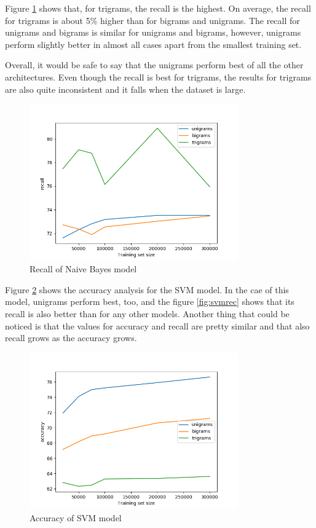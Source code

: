 Figure \ref{fig:nbrec} shows that, for trigrams, the recall is the highest. On average, the recall for trigrams is about 5\% higher than for bigrams and unigrams. The recall for unigrams and bigrams is similar for unigrams and bigrams, however, unigrams perform slightly better in almost all cases apart from the smallest training set.

Overall, it would be safe to say that the unigrams perform best of all the other architectures. Even though the recall is best for trigrams, the results for trigrams are also quite inconsistent and it falls when the dataset is large.

\begin{figure}[ht]
    \centering
    \includegraphics[width=0.8\textwidth]{NaiveBayesrec}
    \caption{Recall of Naive Bayes model}
    \label{fig:nbrec}
\end{figure}

Figure \ref{fig:svmacc} shows the accuracy analysis for the SVM model. In the cae of this model, unigrams perform best, too, and the figure \ref{fig:svmrec} shows that its recall is also better than for any other models. Another thing that could be noticed is that the values for accuracy and recall are pretty similar and that also recall grows as the accuracy grows. 

\begin{figure}[ht]
    \centering
    \includegraphics[width=0.8\textwidth]{SVMacc}
    \caption{Accuracy of SVM model}
    \label{fig:svmacc}
\end{figure}

